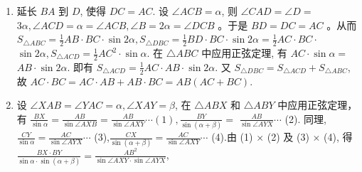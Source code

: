 \documentclass[10pt]{article}
\begin{document}
\begin{enumerate}
  \item 延长 $B A$ 到 $D$, 使得 $D C=A C$. 设 $\angle A C B=\alpha$, 则 $\angle C A D=\angle D=$ $3 \alpha, \angle A C D=\alpha=\angle A C B, \angle B=2 \alpha=\angle D C B$ 。于是 $B D=D C=A C$ 。从而 $S_{\triangle A B C}=\frac{1}{2} A B \cdot B C \cdot \sin 2 \alpha, S_{\triangle D B C}=\frac{1}{2} B D \cdot B C \cdot \sin 2 \alpha=\frac{1}{2} A C \cdot B C \cdot$ $\sin 2 \alpha, S_{\triangle A C D}=\frac{1}{2} A C^{2} \cdot \sin \alpha$. 在 $\triangle A B C$ 中应用正弦定理, 有 $A C \cdot \sin \alpha=$ $A B \cdot \sin 2 \alpha$. 即有 $S_{\triangle A C D}=\frac{1}{2} A C \cdot A B \cdot \sin 2 \alpha$. 又 $S_{\triangle D B C}=S_{\triangle A C D}+S_{\triangle A B C}$, 故 $A C \cdot B C=A C \cdot A B+A B \cdot B C=A B(A C+B C)$.
  \item 设 $\angle X A B=\angle Y A C=\alpha, \angle X A Y=\beta$, 在 $\triangle A B X$ 和 $\triangle A B Y$ 中应用正弦定理，有 $\frac{B X}{\sin \alpha}=\frac{A B}{\sin \angle A X B}=\frac{A B}{\sin \angle A X Y} \cdots(1), \frac{B Y}{\sin (\alpha+\beta)}=$ $\frac{A B}{\sin \angle A Y X} \cdots$ (2). 同理, $\frac{C Y}{\sin \alpha}=\frac{A C}{\sin \angle A Y X} \cdots$ (3),$\frac{C X}{\sin (\alpha+\beta)}=\frac{A C}{\sin \angle A X Y} \cdots$ (4).由 (1) $\times$ (2) 及 (3) $\times$ (4), 得 $\frac{B X \cdot B Y}{\sin \alpha \cdot \sin (\alpha+\beta)}=\frac{A B^{2}}{\sin \angle A X Y \cdot \sin \angle A Y X}$,
\end{enumerate}
\end{document}
